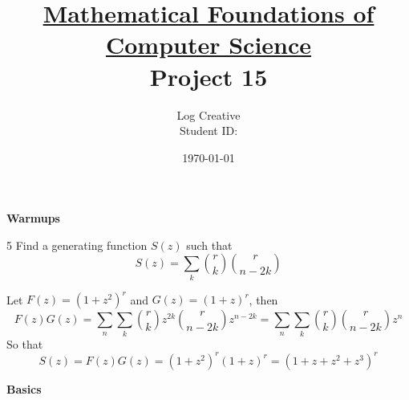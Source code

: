 \documentclass[a4paper,12pt]{article}
\title{\small \underline{Mathematical Foundations of Computer Science}\\\Large Project 15}
\author{Log Creative\\\small Student ID: }
\date{\today}
\makeatletter
\newtheorem*{solution}{Solution}
\theoremstyle{definition}
\renewenvironment{solution}[1][Solution] {\par\pushQED{\qed}\normalfont\topsep6\p@\@plus6\p@\relax\trivlist\item[\hskip\labelsep\bfseries#1\@addpunct{.}]\ignorespaces}{\popQED\endtrivlist\@endpefalse} \makeatother
\newenvironment{problems}{\begin{list}{}{\renewcommand{\makelabel}[1]{\textbf{##1}\hfil}}}{\end{list}}
\makeatother
\begin{document}
\maketitle

\noindent\textbf{Warmups}

\begin{problems}
   \item[5]Find a generating function $S(z)$ such that
   \begin{equation*}
        [z^n]S(z) = \sum_k \binom{r}{k} \binom{r}{n-2k}
   \end{equation*}
   \begin{solution}
      Let $F(z)=(1+z^2)^r$ and $G(z)=(1+z)^r$, then
      \begin{equation*}
         F(z)G(z) = \sum_{n}\sum_{k} \binom{r}{k} z^{2k} \binom{r}{n-2k} z^{n-2k} = \sum_{n}\sum_{k} \binom{r}{k}\binom{r}{n-2k} z^n
      \end{equation*}
      So that
      \begin{equation*}
         S(z) = F(z)G(z) = (1+z^2)^r (1+z)^r = (1+z+z^2+z^3)^r
      \end{equation*}
   \end{solution}
\end{problems}

\noindent\textbf{Basics}
\end{document}

